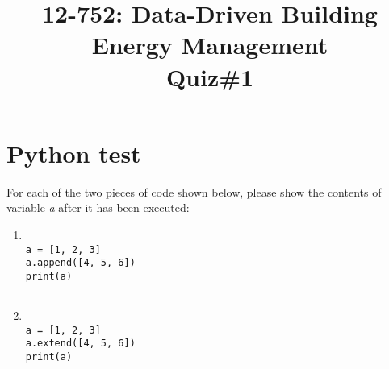 \documentclass[times, 12pt, singlecolumn]{article}
\title{12-752: Data-Driven Building Energy Management\\ Quiz\#1}
\begin{document}
\maketitle

\section{Python test}

For each of the two pieces of code shown below, please show the contents of variable {\em a} after it has been executed:

\begin{enumerate}
	\item{	\begin{verbatim}

a = [1, 2, 3]
a.append([4, 5, 6])
print(a)	


		\end{verbatim}}
	\item{	\begin{verbatim}

a = [1, 2, 3]
a.extend([4, 5, 6])
print(a)	


		\end{verbatim}}
\end{enumerate}
\end{document}
